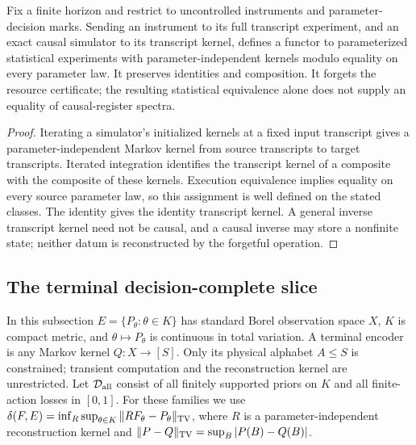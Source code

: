 \begin{proposition}
\label{prop:v8-forgetful}
Fix a finite horizon and restrict to uncontrolled instruments and
parameter-decision marks. Sending an instrument to its full transcript
experiment, and an exact causal simulator to its transcript kernel,
defines a functor to parameterized statistical experiments with
parameter-independent kernels modulo equality on every parameter law.
It preserves identities and composition. It forgets the resource
certificate; the resulting statistical equivalence alone does not
supply an equality of causal-register spectra.
\end{proposition}
\begin{proof}
Iterating a simulator's initialized kernels at a fixed input transcript
gives a parameter-independent Markov kernel from source transcripts to
target transcripts. Iterated integration identifies the transcript
kernel of a composite with the composite of these kernels. Execution
equivalence implies equality on every source parameter law, so this
assignment is well defined on the stated classes. The identity gives
the identity transcript kernel. A general inverse transcript kernel
need not be causal, and a causal inverse may store a nonfinite state;
neither datum is reconstructed by the forgetful operation.
\end{proof}

\subsection{The terminal decision-complete slice}
In this subsection $E=\{P_\theta:\theta\in K\}$ has standard Borel
observation space $X$, $K$ is compact metric, and $\theta\mapsto P_\theta$
is continuous in total variation. A terminal encoder is any Markov kernel
$Q:X\to[S]$. Only its physical alphabet $A\le S$ is constrained; transient
computation and the reconstruction kernel are unrestricted. Let
$\mathcal D_{\rm all}$ consist of all finitely supported priors on $K$
and all finite-action losses in $[0,1]$. For these families we use
$\delta(F,E)=\inf_R\sup_{\theta\in K}\|RF_\theta-P_\theta\|_{\rm TV}$,
where $R$ is a parameter-independent reconstruction kernel and
$\|P-Q\|_{\rm TV}=\sup_B|P(B)-Q(B)|$.

